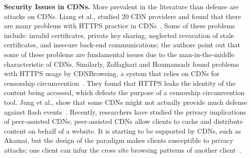 \textbf{Security Issues in CDNs.} More prevalent in the literature than defense are attacks on CDNs.  Liang et al., studied 
20 CDN providers and found that there are many problems with HTTPS practice in CDNs~\cite{liang2014https}.  Some of these 
problems include: invalid certificates, private key sharing, neglected revocation of stale certificates, and 
insecure back-end communications; the authors point out that some of these problems are fundamental issues due to 
the man-in-the-middle characteristic of CDNs.  Similarly, Zolfaghari and Houmansadr found problems with HTTPS usage by 
CDNBrowsing, a system that relies on CDNs for censorship circumvention~\cite{zolfaghari2016practical}.  They found that HTTPS 
leaks the identity of the content being accessed, which defeats the purpose of a censorship circumvention tool. Jung et al., show 
that some CDNs might not actually provide much defense against flash events~\cite{jung2002flash}.  Recently, researchers have studied the privacy implications of peer-assisted CDNs; peer-assisted CDNs allow clients to cache and distribute 
content on behalf of a website.  It is starting to be supported by CDNs, such as Akamai, but the design of the paradigm
makes clients susceptible to privacy attacks; one client can infur the cross site browsing patterns of another client~\cite{jia2016anonymity}.



